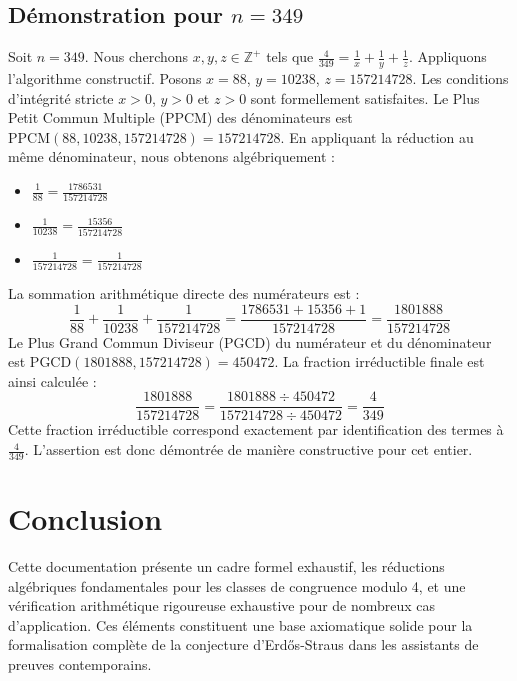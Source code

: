 \documentclass[11pt,a4paper]{article}
\begin{document}
\subsection{Démonstration pour $n = 349$}
Soit $n = 349$. Nous cherchons $x, y, z \in \mathbb{Z}^{+}$ tels que $\frac{4}{349} = \frac{1}{x} + \frac{1}{y} + \frac{1}{z}$.
Appliquons l'algorithme constructif. Posons $x = 88$, $y = 10238$, $z = 157214728$.
Les conditions d'intégrité stricte $x > 0$, $y > 0$ et $z > 0$ sont formellement satisfaites.
Le Plus Petit Commun Multiple (PPCM) des dénominateurs est $\text{PPCM}(88, 10238, 157214728) = 157214728$.
En appliquant la réduction au même dénominateur, nous obtenons algébriquement :
\begin{itemize}
    \item $\frac{1}{88} = \frac{1786531}{157214728}$
    \item $\frac{1}{10238} = \frac{15356}{157214728}$
    \item $\frac{1}{157214728} = \frac{1}{157214728}$
\end{itemize}
La sommation arithmétique directe des numérateurs est :
$$ \frac{1}{88} + \frac{1}{10238} + \frac{1}{157214728} = \frac{1786531 + 15356 + 1}{157214728} = \frac{1801888}{157214728} $$
Le Plus Grand Commun Diviseur (PGCD) du numérateur et du dénominateur est $\text{PGCD}(1801888, 157214728) = 450472$.
La fraction irréductible finale est ainsi calculée :
$$ \frac{1801888}{157214728} = \frac{1801888 \div 450472}{157214728 \div 450472} = \frac{4}{349} $$
Cette fraction irréductible correspond exactement par identification des termes à $\frac{4}{349}$. L'assertion est donc démontrée de manière constructive pour cet entier.

\section{Conclusion}

Cette documentation présente un cadre formel exhaustif, les réductions algébriques fondamentales pour les classes de congruence modulo 4, et une vérification arithmétique rigoureuse exhaustive pour de nombreux cas d'application. Ces éléments constituent une base axiomatique solide pour la formalisation complète de la conjecture d'Erd\H{o}s-Straus dans les assistants de preuves contemporains.
\end{document}
